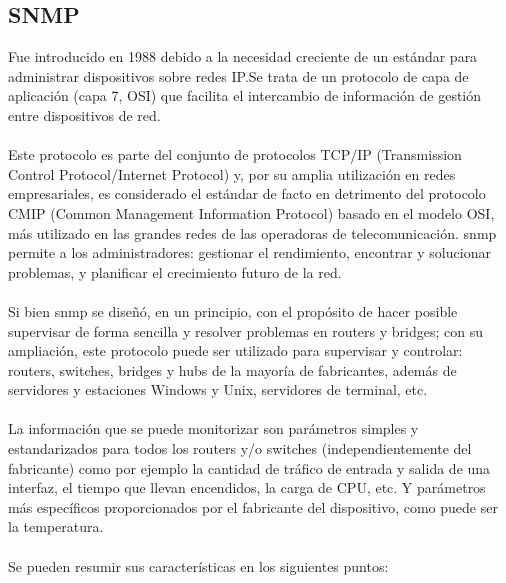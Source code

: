 \documentclass[letterpaper]{article}
\begin{document}
\subsection{SNMP} %
Fue introducido en 1988 debido a la necesidad creciente de un estándar para
administrar dispositivos sobre redes IP.\@ Se trata de un protocolo de capa de aplicación
(capa 7, OSI) que facilita el intercambio de información de gestión entre dispositivos de
red.\\\\
Este protocolo es parte del conjunto de protocolos TCP/IP (Transmission
Control Protocol/Internet Protocol) y, por su amplia utilización en redes empresariales,
es considerado el estándar de facto en detrimento del protocolo CMIP (Common
Management Information Protocol) basado en el modelo OSI, más utilizado en las
grandes redes de las operadoras de telecomunicación. \acrshort{snmp} permite a los
administradores: gestionar el rendimiento, encontrar y solucionar problemas, y
planificar el crecimiento futuro de la red.\\\\
Si bien \acrshort{snmp} se diseñó, en un principio, con el propósito de hacer posible
supervisar de forma sencilla y resolver problemas en routers y bridges; con su
ampliación, este protocolo puede ser utilizado para supervisar y controlar: routers,
switches, bridges y hubs de la mayoría de fabricantes, además de servidores y
estaciones Windows y Unix, servidores de terminal, etc.\\\\
La información que se puede monitorizar son parámetros simples y
estandarizados para todos los routers y/o switches (independientemente del fabricante)
como por ejemplo la cantidad de tráfico de entrada y salida de una interfaz, el tiempo
que llevan encendidos, la carga de CPU, etc. Y parámetros más específicos
proporcionados por el fabricante del dispositivo, como puede ser la temperatura.\\\\
Se pueden resumir sus características en los siguientes puntos:
\end{document}
